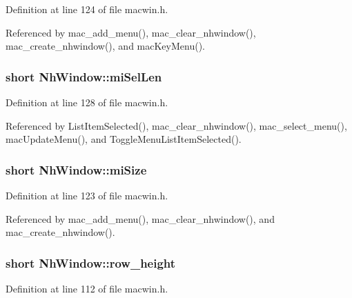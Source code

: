 Definition at line 124 of file macwin.\+h.



Referenced by mac\+\_\+add\+\_\+menu(), mac\+\_\+clear\+\_\+nhwindow(), mac\+\_\+create\+\_\+nhwindow(), and mac\+Key\+Menu().

\hypertarget{structNhWindow_acf4c482c6ba7d237118a81148d838c17}{
\subsubsection[{mi\+Sel\+Len}]{\setlength{\rightskip}{0pt plus 5cm}short Nh\+Window\+::mi\+Sel\+Len}}\label{structNhWindow_acf4c482c6ba7d237118a81148d838c17}


Definition at line 128 of file macwin.\+h.



Referenced by List\+Item\+Selected(), mac\+\_\+clear\+\_\+nhwindow(), mac\+\_\+select\+\_\+menu(), mac\+Update\+Menu(), and Toggle\+Menu\+List\+Item\+Selected().

\hypertarget{structNhWindow_adf87c11968010efad19a04910e5cb890}{
\subsubsection[{mi\+Size}]{\setlength{\rightskip}{0pt plus 5cm}short Nh\+Window\+::mi\+Size}}\label{structNhWindow_adf87c11968010efad19a04910e5cb890}


Definition at line 123 of file macwin.\+h.



Referenced by mac\+\_\+add\+\_\+menu(), mac\+\_\+clear\+\_\+nhwindow(), and mac\+\_\+create\+\_\+nhwindow().

\hypertarget{structNhWindow_a2df8c3e9deac0c0d0a5d9793b7470055}{
\subsubsection[{row\+\_\+height}]{\setlength{\rightskip}{0pt plus 5cm}short Nh\+Window\+::row\+\_\+height}}\label{structNhWindow_a2df8c3e9deac0c0d0a5d9793b7470055}


Definition at line 112 of file macwin.\+h.



